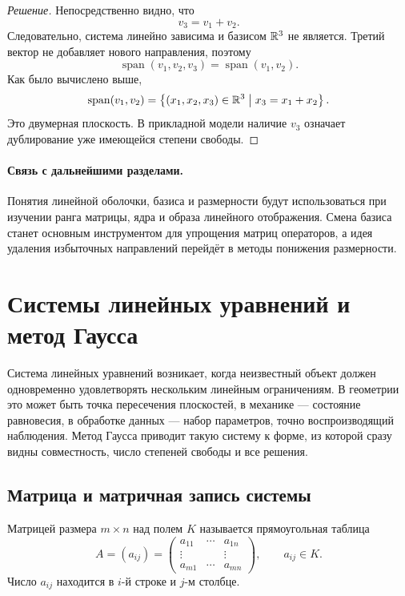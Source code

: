 \begin{proof}[Решение]
Непосредственно видно, что
\[
v_3=v_1+v_2.
\]
Следовательно, система линейно зависима и базисом \(\mathbb{R}^3\) не является. Третий вектор не добавляет нового направления, поэтому
\[
\operatorname{span}(v_1,v_2,v_3)
=
\operatorname{span}(v_1,v_2).
\]
Как было вычислено выше,
\[
\operatorname{span}(v_1,v_2)
=
\left\{(x_1,x_2,x_3)\in\mathbb{R}^3
\;\middle|\;
x_3=x_1+x_2\right\}.
\]
Это двумерная плоскость. В прикладной модели наличие \(v_3\) означает дублирование уже имеющейся степени свободы.
\end{proof}

\paragraph{Связь с дальнейшими разделами.}

Понятия линейной оболочки, базиса и размерности будут использоваться при изучении ранга матрицы, ядра и образа линейного отображения. Смена базиса станет основным инструментом для упрощения матриц операторов, а идея удаления избыточных направлений перейдёт в методы понижения размерности.

\section{Системы линейных уравнений и метод Гаусса}
\label{sec:linear-systems-gauss}

Система линейных уравнений возникает, когда неизвестный объект должен одновременно удовлетворять нескольким линейным ограничениям. В геометрии это может быть точка пересечения плоскостей, в механике --- состояние равновесия, в обработке данных --- набор параметров, точно воспроизводящий наблюдения. Метод Гаусса приводит такую систему к форме, из которой сразу видны совместность, число степеней свободы и все решения.

\subsection{Матрица и матричная запись системы}

\begin{definition}
Матрицей размера \(m\times n\) над полем \(K\) называется прямоугольная таблица
\[
A=(a_{ij})
=
\begin{pmatrix}
a_{11}&\cdots&a_{1n}\\
\vdots&&\vdots\\
a_{m1}&\cdots&a_{mn}
\end{pmatrix},
\qquad
a_{ij}\in K.
\]
Число \(a_{ij}\) находится в \(i\)-й строке и \(j\)-м столбце.
\end{definition}

